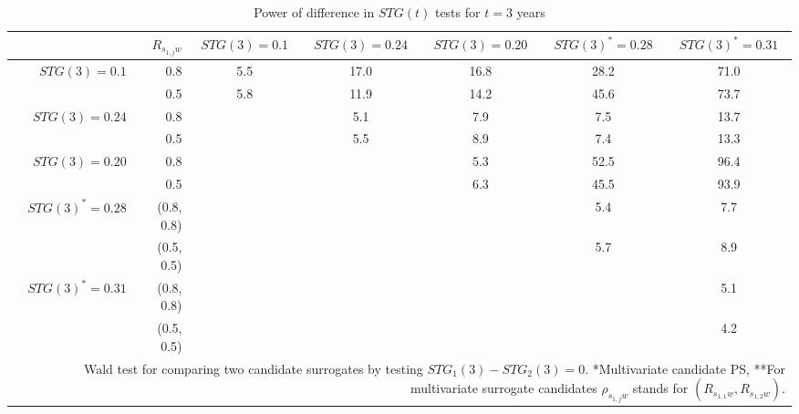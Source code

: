 
\begin{sidewaystable}[ht]
\begin{center}
\caption{Power of difference in $STG(t)$ tests for $t=3$ years \label{Power}}
\begin{tabular}{rrccccc}
  \hline
 & $R_{s_{1,j}w}$ & $STG(3)=0.1$  & $STG(3)=0.24$  & $STG(3)=0.20$& $STG(3)^{*}=0.28$  & $STG(3)^{*}=0.31$\\
  \hline
$STG(3)=0.1$ &0.8 & 5.5 & 17.0 & 16.8 & 28.2 & 71.0 \\ 
   &0.5 &5.8 & 11.9 & 14.2 & 45.6 & 73.7 \\ 
$STG(3)=0.24$ &0.8&  & 5.1 & 7.9 & 7.5 & 13.7 \\ 
   &0.5 &  & 5.5 & 8.9 & 7.4 & 13.3 \\ 
$STG(3)=0.20$&0.8 &  &  & 5.3 & 52.5 & 96.4 \\ 
   &0.5&  &  & 6.3 & 45.5 & 93.9 \\ 
$STG(3)^{*}=0.28$&(0.8, 0.8) &  &  &  & 5.4 & 7.7 \\ 
   &(0.5, 0.5) &  &  &  & 5.7 & 8.9 \\ 
$STG(3)^{*}=0.31$&(0.8, 0.8)&   &  &  &  & 5.1 \\ 
   &(0.5, 0.5)&  &  &  &  & 4.2 \\ 
   \hline
\multicolumn{7}{p{9in}}{Wald test for comparing two candidate surrogates by testing $STG_1(3)-STG_2(3)=0$. *Multivariate candidate PS, **For multivariate surrogate candidates $\rho_{s_{1,j}w}$ stands for $(R_{s_{1,1}w},R_{s_{1,2}w})$.}
\end{tabular}
\end{center}
\end{sidewaystable}
